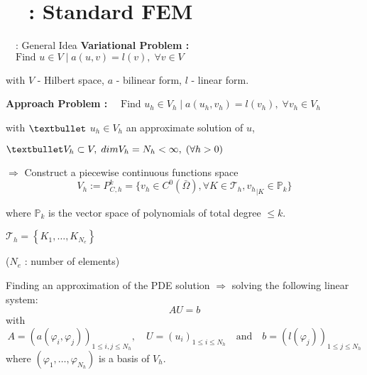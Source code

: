 \section{\appendixname~\theappendixframenumber~: Standard FEM}

\begin{frame}{\appendixname~\theappendixframenumber~: General Idea}
	\textbf{Variational Problem :} $\quad\text{Find } u\in V \; | \; a(u,v)=l(v), \;\forall v\in V$
	
	with $V$ - Hilbert space, $a$ - bilinear form, $l$ - linear form.
	
	\vspace{10pt}
	
	\begin{minipage}[t]{0.76\linewidth}
		\textbf{Approach Problem :} $\quad \text{Find } u_h\in V_h \; | \; a(u_h,v_h)=l(v_h), \;\forall v_h\in V_h$
		
		with $\textbullet$ $u_h\in V_h$ an approximate solution of $u$, 
		
		$\textbullet V_h\subset V, \; dim V_h=N_h<\infty, \; (\forall h>0)$ 
		
		$\Rightarrow$ Construct a piecewise continuous functions space
		\vspace{-5pt}
		\begin{equation*}
			V_h:=P_{C,h}^k=\{v_h\in C^0(\bar{\Omega}), \forall K\in\mathcal{T}_h, {v_h}_{|K}\in\mathbb{P}_k\}
		\end{equation*}
		
		where $\mathbb{P}_k$ is the vector space of polynomials of total degree $\le k$.
	\end{minipage} \hfill \begin{minipage}[t][][b]{0.2\linewidth}
		\vspace{-5pt}
		\centering
		
		\footnotesize
		$\mathcal{T}_h = \left\{K_1,\dots,K_{N_e}\right\}$
		
		\tiny
		($N_e$ : number of elements)
	\end{minipage}
	
	\vspace{10pt}
	
	Finding an approximation of the PDE solution $\Rightarrow$ solving the following linear system:
	\begin{equation*}
		AU=b
	\end{equation*}
	with
	\begin{equation*}
		A=(a(\varphi_i,\varphi_j))_{1\le i,j\le N_h}, \quad U=(u_i)_{1\le i\le N_h} \quad \text{and} \quad b=(l(\varphi_j))_{1\le j\le N_h}
	\end{equation*}
	where $(\varphi_1,\dots,\varphi_{N_h})$ is a basis of $V_h$.
\end{frame}
\addtocounter{appendixframenumber}{1}

